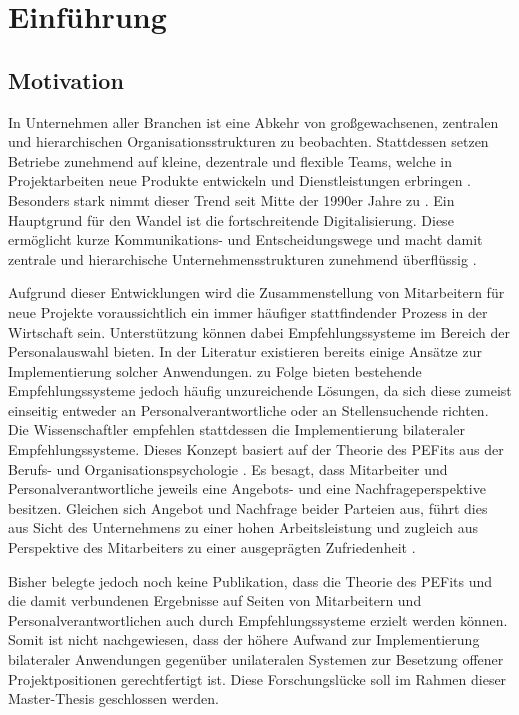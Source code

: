 \chapter{Einführung}
\label{ch:intro}

\section{Motivation}
\label{sec:intro:motivation}
In Unternehmen aller Branchen ist eine Abkehr von großgewachsenen, zentralen und hierarchischen Organisationsstrukturen zu beobachten. Stattdessen setzen Betriebe zunehmend auf kleine, dezentrale und flexible Teams, welche in Projektarbeiten neue Produkte entwickeln und Dienstleistungen erbringen \cite[S. 3]{elanceEconomy:1999}. Besonders stark nimmt dieser Trend seit Mitte der 1990er Jahre zu \cite[S. 8]{whittington:1999}. Ein Hauptgrund für den Wandel ist die fortschreitende Digitalisierung. Diese ermöglicht kurze Kommunikations- und Entscheidungswege und macht damit zentrale und hierarchische Unternehmensstrukturen zunehmend überflüssig \cite[S. 5]{elanceEconomy:1999}.

Aufgrund dieser Entwicklungen wird die Zusammenstellung von Mitarbeitern für neue Projekte voraussichtlich ein immer häufiger stattfindender Prozess in der Wirtschaft sein. Unterstützung können dabei Empfehlungssysteme im Bereich der Personalauswahl bieten. In der Literatur existieren bereits einige Ansätze zur Implementierung solcher Anwendungen. \textcite[S. 1ff.]{malinowski:2006} zu Folge bieten bestehende Empfehlungssysteme jedoch häufig unzureichende Lösungen, da sich diese zumeist einseitig entweder an Personalverantwortliche oder an Stellensuchende richten. Die Wissenschaftler empfehlen stattdessen die Implementierung bilateraler Empfehlungssysteme. Dieses Konzept basiert auf der Theorie des \acp{PEFit} aus der Berufs- und Organisationspsychologie \cite[S. 3.f]{malinowski:2006}. Es besagt, dass Mitarbeiter und Personalverantwortliche jeweils eine Angebots- und eine Nachfrageperspektive besitzen. Gleichen sich Angebot und Nachfrage beider Parteien aus, führt dies aus Sicht des Unternehmens zu einer hohen Arbeitsleistung und zugleich aus Perspektive des Mitarbeiters zu einer ausgeprägten Zufriedenheit \cite[S. 6]{su:2015}.

Bisher belegte jedoch noch keine Publikation, dass die Theorie des \acp{PEFit} und die damit verbundenen Ergebnisse auf Seiten von Mitarbeitern und Personalverantwortlichen auch durch Empfehlungssysteme erzielt werden können. Somit ist nicht nachgewiesen, dass der höhere Aufwand zur Implementierung bilateraler Anwendungen gegenüber unilateralen Systemen zur Besetzung offener Projektpositionen gerechtfertigt ist. Diese Forschungslücke soll im Rahmen dieser Master-Thesis geschlossen werden.

